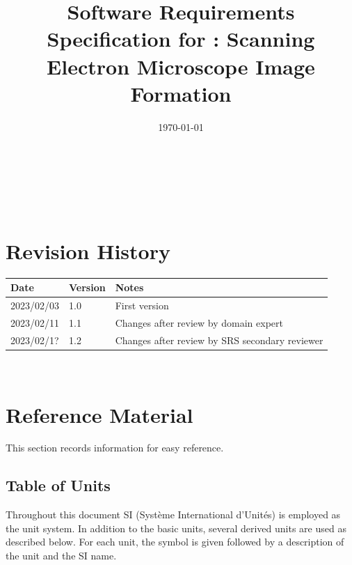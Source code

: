 \documentclass[12pt]{article}
\begin{document}

\title{Software Requirements Specification for \progname: Scanning Electron Microscope Image Formation} 
\author{\authname}
\date{\today}
	
\maketitle

~\newpage


\tableofcontents

~\newpage

\section*{Revision History}

\begin{tabularx}{\textwidth}{p{3cm}p{2cm}X}
\toprule {\bf Date} & {\bf Version} & {\bf Notes}\\
\midrule
2023/02/03 & 1.0 & First version\\
2023/02/11 & 1.1 & Changes after review by domain expert\\
2023/02/1? & 1.2 & Changes after review by SRS secondary reviewer\\
\bottomrule
\end{tabularx}

~\newpage

\section{Reference Material}

This section records information for easy reference.

\subsection{Table of Units}

Throughout this document SI (Syst\`{e}me International d'Unit\'{e}s) is employed
as the unit system.  In addition to the basic units, several derived units are
used as described below.  For each unit, the symbol is given followed by a
description of the unit and the SI name.
~\newline
\end{document}
